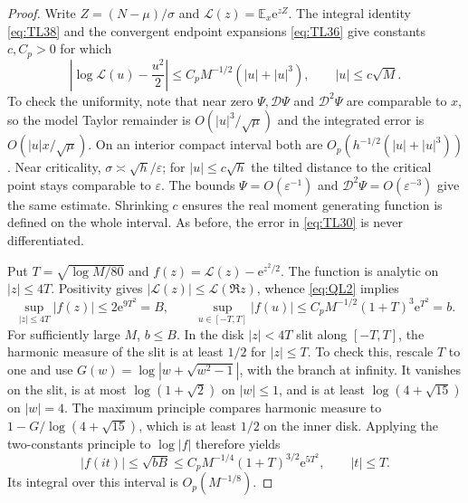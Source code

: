 \begin{proof}
Write $Z=(N-\mu)/\sigma$ and $\mathcal L(z)=\mathbb E_x \mathrm{e}^{zZ}$.
The integral identity \eqref{eq:TL38} and the convergent endpoint
expansions \eqref{eq:TL36} give constants $c,C_p>0$ for which
\begin{equation}
 \left|\log\mathcal L(u)-\frac{u^2}{2}\right|
 \le C_p M^{-1/2}(|u|+|u|^3),\qquad |u|\le c\sqrt M.
 \label{eq:QL2}
\end{equation}
To check the uniformity, note that near zero $\Psi,\mathscr D\Psi$ and
$\mathscr D^2\Psi$ are comparable to $x$, so the model Taylor remainder
is $O(|u|^3/\sqrt\mu)$ and the integrated error is
$O(|u|x/\sqrt\mu)$. On an interior compact interval both are
$O_p(h^{-1/2}(|u|+|u|^3))$. Near criticality,
$\sigma\asymp\sqrt h/\varepsilon$; for $|u|\le c\sqrt h$ the tilted
distance to the critical point stays comparable to $\varepsilon$.
The bounds $\Psi=O(\varepsilon^{-1})$ and
$\mathscr D^2\Psi=O(\varepsilon^{-3})$ give the same estimate.
Shrinking $c$ ensures the real moment generating function is defined
on the whole interval. As before, the error in \eqref{eq:TL30} is never
differentiated.

Put $T=\sqrt{\log M/80}$ and $f(z)=\mathcal L(z)-\mathrm{e}^{z^2/2}$.
The function is analytic on $|z|\le4T$. Positivity gives
$|\mathcal L(z)|\le\mathcal L(\Re z)$, whence \eqref{eq:QL2} implies
\begin{equation}
 \sup_{|z|\le4T}|f(z)|\le2\mathrm{e}^{9T^2}=B,\qquad
 \sup_{u\in[-T,T]}|f(u)|
 \le C_p M^{-1/2}(1+T)^3\mathrm{e}^{T^2}=b.
 \label{eq:QL3}
\end{equation}
For sufficiently large $M$, $b\le B$. In the disk $|z|<4T$ slit along
$[-T,T]$, the harmonic measure of the slit is at least $1/2$ for
$|z|\le T$. To check this, rescale $T$ to one and use
$G(w)=\log|w+\sqrt{w^2-1}|$, with the branch at infinity.
It vanishes on the slit, is at most $\log(1+\sqrt2)$ on $|w|\le1$,
and is at least $\log(4+\sqrt{15})$ on $|w|=4$.
The maximum principle compares harmonic measure to
$1-G/\log(4+\sqrt{15})$, which is at least $1/2$ on the inner disk.
Applying the two-constants principle to $\log|f|$ therefore yields
\begin{equation}
 |f(it)|\le\sqrt{bB}
 \le C_p M^{-1/4}(1+T)^{3/2}\mathrm{e}^{5T^2},\qquad |t|\le T.
 \label{eq:QL4}
\end{equation}
Its integral over this interval is $O_p(M^{-1/8})$.


\end{proof}
